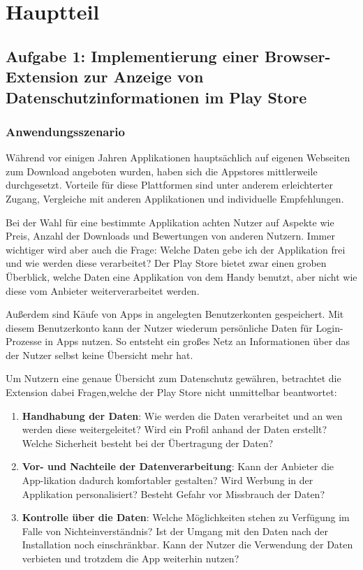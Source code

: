 \chapter{Hauptteil}
\label{c:hauptteil}

\section{Aufgabe 1: Implementierung einer Browser-Extension zur Anzeige von Datenschutzinformationen im Play Store}
\label{s:implementierungextension}

\subsection{Anwendungsszenario}
\label{ss:anwendungsszenario}


Während vor einigen Jahren Applikationen hauptsächlich auf eigenen Webseiten zum Download angeboten wurden, haben sich die
Appstores mittlerweile durchgesetzt. Vorteile für diese Plattformen sind unter anderem erleichterter Zugang, Vergleiche mit anderen Applikationen und individuelle Empfehlungen.

Bei der Wahl für eine bestimmte Applikation achten Nutzer auf Aspekte wie Preis, Anzahl der Downloads und Bewertungen von anderen Nutzern. Immer wichtiger wird aber auch die Frage: Welche Daten gebe ich der Applikation frei und wie werden diese verarbeitet? Der Play Store bietet zwar einen groben Überblick, welche Daten eine Applikation von dem Handy benutzt, aber nicht wie diese vom Anbieter weiterverarbeitet werden.

Außerdem sind Käufe von Apps in angelegten Benutzerkonten gespeichert. Mit diesem Benutzerkonto kann der Nutzer wiederum persönliche Daten für Login-Prozesse in Apps nutzen. So entsteht ein großes Netz an Informationen über das der Nutzer selbst keine Übersicht mehr hat.

Um Nutzern eine genaue Übersicht zum Datenschutz gewähren, betrachtet die Extension dabei Fragen,welche der Play Store nicht unmittelbar beantwortet:


 \begin{enumerate}
 	\item \textbf{Handhabung der Daten}: Wie werden die Daten verarbeitet und an wen werden diese weitergeleitet? Wird ein Profil anhand der Daten erstellt? Welche Sicherheit besteht bei der Übertragung der Daten?
 	
 	\item \textbf{Vor- und Nachteile der Datenverarbeitung}: Kann der Anbieter die App-likation dadurch komfortabler gestalten? Wird Werbung in der Applikation personalisiert? Besteht Gefahr vor Missbrauch der Daten?
 	
 	\item \textbf{Kontrolle über die Daten}: Welche Möglichkeiten stehen zu Verfügung im Falle von Nichteinverständnis? Ist der Umgang mit den Daten nach der Installation noch einschränkbar. Kann der Nutzer die Verwendung der Daten verbieten und trotzdem die App weiterhin nutzen?
 \end{enumerate}

